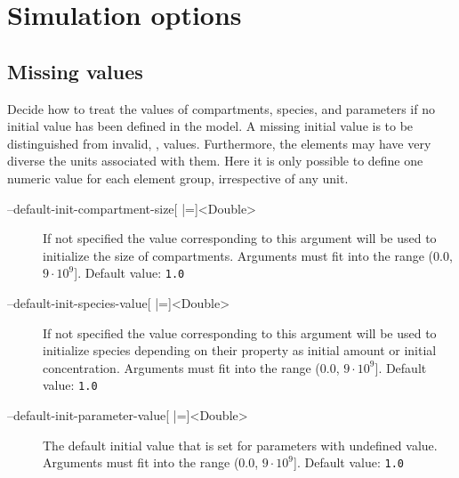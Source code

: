 \section{Simulation options}
\subsection{Missing values}
Decide how to treat the values of compartments, species, and parameters if no initial value has been defined in the model. A missing initial value is to be distinguished from invalid, \ie \NaN, values. Furthermore, the elements may have very diverse the units associated with them. Here it is only possible to define one numeric value for each element group, irrespective of any unit.
\begin{description}
\item[--default-init-compartment-size{[} |={]}<Double>]
          If not specified the value corresponding to this argument will
          be used to initialize the size of compartments.
          Arguments must fit into the range (0.0, $9\cdot 10^9${]}.
          Default value: \texttt{1.0}
\item[--default-init-species-value{[} |={]}<Double>]
          If not specified the value corresponding to this argument will
          be used to initialize species depending on their \hasOnlySubstanceUnits
          property as initial amount or initial concentration.
          Arguments must fit into the range (0.0, $9\cdot 10^9${]}.
          Default value: \texttt{1.0}
\item[--default-init-parameter-value{[} |={]}<Double>]
          The default initial value that is set for parameters with undefined value.
          Arguments must fit into the range (0.0, $9\cdot 10^9${]}.
          Default value: \texttt{1.0}
\end{description}

